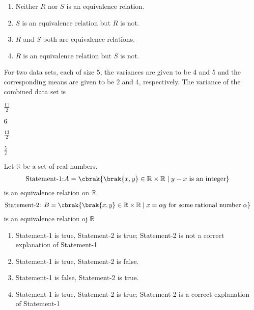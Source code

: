    \hfill{}
    \begin{enumerate}
        \item Neither $R$ nor $S$ is an equivalence relation.
        \item $S$ is an equivalence relation but $R$ is not.
        \item $R$ and $S$ both are equivalence relations.
        \item $R$ is an equivalence relation but $S$ is not.
    \end{enumerate}
    
    \item For two data sets, each of size 5, the variances are given to be 4 and 5 and the corresponding means are given to be 2 and 4, respectively. The variance of the combined data set is
    
    \hfill{}
    \begin{enumerate}
    \begin{multicols}{4}
        \item $\frac{11}{2}$
        \item $6$
        \item $\frac{13}{2}$
        \item $\frac{5}{2}$
    \end{multicols}
    \end{enumerate}
    
    \item Let $\mathbb{R}$ be a set of real numbers. \newline
	    \begin{align*} \text{Statement-1:} A = \cbrak{\brak{x, y} \in \mathbb{R}  \times \mathbb{R}  \mid y - x \text{ is an integer}}
	    \end{align*} is an equivalence relation on $\mathbb{R}$
	\begin{align*}
		\text{Statement-2: }B = \cbrak{\brak{x, y} \in \mathbb{R} \times \mathbb{R}  \mid x = \alpha y \text{ for some rational number } \alpha }
	\end{align*} is an equivalence relation oj $\mathbb{R}$

    \hfill{}
    \begin{enumerate}
        \item Statement-1 is true, Statement-2 is true; Statement-2 is not a correct explanation of Statement-1
        \item Statement-1 is true, Statement-2 is false.
        \item Statement-1 is false, Statement-2 is true.
        \item Statement-1 is true, Statement-2 is true; Statement-2 is a correct explanation of Statement-1
    \end{enumerate}
    
